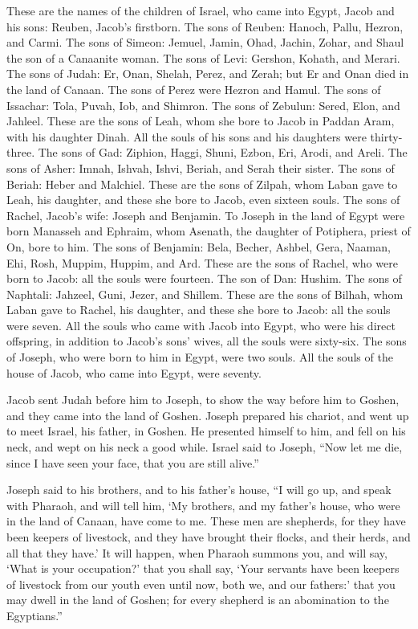 \myverse{}These are the names of the children of Israel, who came into Egypt, Jacob and his sons: Reuben, Jacob’s firstborn.  \myverse{}The sons of Reuben: Hanoch, Pallu, Hezron, and Carmi.  \myverse{}The sons of Simeon: Jemuel, Jamin, Ohad, Jachin, Zohar, and Shaul the son of a Canaanite woman. \myverse{}The sons of Levi: Gershon, Kohath, and Merari.  \myverse{}The sons of Judah: Er, Onan, Shelah, Perez, and Zerah; but Er and Onan died in the land of Canaan. The sons of Perez were Hezron and Hamul.  \myverse{}The sons of Issachar: Tola, Puvah, Iob, and Shimron.  \myverse{}The sons of Zebulun: Sered, Elon, and Jahleel.  \myverse{}These are the sons of Leah, whom she bore to Jacob in Paddan Aram, with his daughter Dinah. All the souls of his sons and his daughters were thirty-three.  \myverse{}The sons of Gad: Ziphion, Haggi, Shuni, Ezbon, Eri, Arodi, and Areli.  \myverse{}The sons of Asher: Imnah, Ishvah, Ishvi, Beriah, and Serah their sister. The sons of Beriah: Heber and Malchiel.  \myverse{}These are the sons of Zilpah, whom Laban gave to Leah, his daughter, and these she bore to Jacob, even sixteen souls.  \myverse{}The sons of Rachel, Jacob’s wife: Joseph and Benjamin.  \myverse{}To Joseph in the land of Egypt were born Manasseh and Ephraim, whom Asenath, the daughter of Potiphera, priest of On, bore to him.  \myverse{}The sons of Benjamin: Bela, Becher, Ashbel, Gera, Naaman, Ehi, Rosh, Muppim, Huppim, and Ard.  \myverse{}These are the sons of Rachel, who were born to Jacob: all the souls were fourteen.  \myverse{}The son of Dan: Hushim.  \myverse{}The sons of Naphtali: Jahzeel, Guni, Jezer, and Shillem.  \myverse{}These are the sons of Bilhah, whom Laban gave to Rachel, his daughter, and these she bore to Jacob: all the souls were seven.  \myverse{}All the souls who came with Jacob into Egypt, who were his direct offspring, in addition to Jacob’s sons’ wives, all the souls were sixty-six.  \myverse{}The sons of Joseph, who were born to him in Egypt, were two souls. All the souls of the house of Jacob, who came into Egypt, were seventy.

\myverse{}Jacob sent Judah before him to Joseph, to show the way before him to Goshen, and they came into the land of Goshen.  \myverse{}Joseph prepared his chariot, and went up to meet Israel, his father, in Goshen. He presented himself to him, and fell on his neck, and wept on his neck a good while.  \myverse{}Israel said to Joseph, “Now let me die, since I have seen your face, that you are still alive.”

\myverse{}Joseph said to his brothers, and to his father’s house, “I will go up, and speak with Pharaoh, and will tell him, ‘My brothers, and my father’s house, who were in the land of Canaan, have come to me.  \myverse{}These men are shepherds, for they have been keepers of livestock, and they have brought their flocks, and their herds, and all that they have.’  \myverse{}It will happen, when Pharaoh summons you, and will say, ‘What is your occupation?’  \myverse{}that you shall say, ‘Your servants have been keepers of livestock from our youth even until now, both we, and our fathers:’ that you may dwell in the land of Goshen; for every shepherd is an abomination to the Egyptians.”

